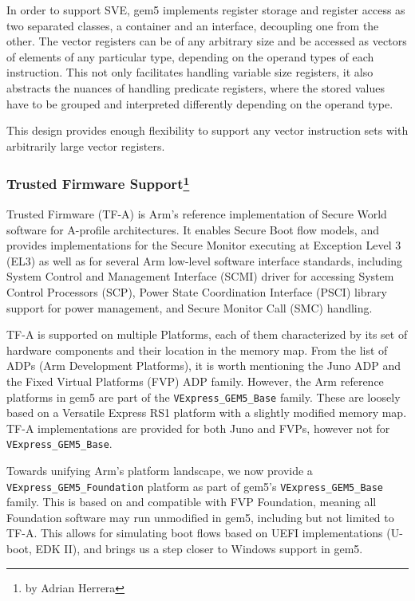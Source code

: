 In order to support SVE, gem5 implements register storage and register access
as two separated classes, a container and an interface, decoupling one from the
other. The vector registers can be of any arbitrary size and be accessed as
vectors of elements of any particular type, depending on the operand types of
each instruction. This not only facilitates handling variable size registers,
it also abstracts the nuances of handling predicate registers, where the stored
values have to be grouped and interpreted differently depending on the operand
type.

This design provides enough flexibility to support any vector instruction sets
with arbitrarily large vector registers.

\subsubsection[Trusted Firmware Support]{Trusted Firmware Support\footnote{by Adrian Herrera}}

Trusted Firmware (TF-A) is Arm's reference implementation of Secure World software for A-profile architectures.
It enables Secure Boot flow models, and provides implementations for the Secure Monitor executing at Exception Level 3 (EL3) as well as for several Arm low-level software interface standards, including System Control and Management Interface (SCMI) driver for accessing System Control Processors (SCP), Power State Coordination Interface (PSCI) library support for power management, and Secure Monitor Call (SMC) handling.

TF-A is supported on multiple Platforms, each of them characterized by its set of hardware components and their location in the memory map.
From the list of ADPs (Arm Development Platforms), it is worth mentioning the Juno ADP and the Fixed Virtual Platforms (FVP) ADP family.
However, the Arm reference platforms in gem5 are part of the \verb|VExpress_GEM5_Base| family.
These are loosely based on a Versatile Express RS1 platform with a slightly modified memory map. TF-A implementations are provided for both Juno and FVPs, however not for \verb|VExpress_GEM5_Base|.

Towards unifying Arm's platform landscape, we now provide a \verb|VExpress_GEM5_Foundation| platform as part of gem5's \verb|VExpress_GEM5_Base| family.
This is based on and compatible with FVP Foundation, meaning all Foundation software may run unmodified in gem5, including but not limited to TF-A.
This allows for simulating boot flows based on UEFI implementations (U-boot, EDK II), and brings us a step closer to Windows support in gem5.
